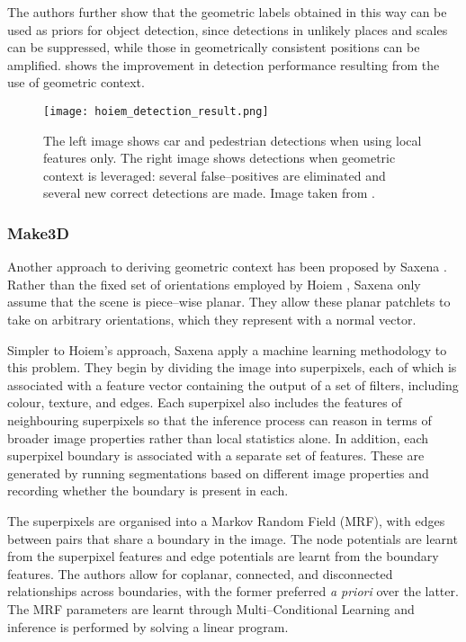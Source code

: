 The authors further show that the geometric labels obtained in this
way can be used as priors for object detection, since detections in
unlikely places and scales can be suppressed, while those in
geometrically consistent positions can be
amplified.  shows the improvement in detection
performance resulting from the use of geometric context.

\begin{figure}[htp]
\centering
\texttt{[image: hoiem\_detection\_result.png]}
\caption{The left image shows car and pedestrian detections when using
  local features only. The right image shows detections when geometric
  context is leveraged: several false--positives are eliminated and
  several new correct detections are made. Image taken from
  \cite{Hoiem06}.}
\label{fig:hoiem-result}
\end{figure}

\subsubsection{Make3D}

Another approach to deriving geometric context has been proposed by
Saxena \etal \cite{Saxena09}. Rather than the fixed set of
orientations employed by Hoiem \etal, Saxena \etal only assume that
the scene is piece--wise planar. They allow these planar patchlets to
take on arbitrary orientations, which they represent with a normal
vector.

Simpler to Hoiem's approach, Saxena \etal apply a machine learning
methodology to this problem. They begin by dividing the image into
superpixels, each of which is associated with a feature vector
containing the output of a set of filters, including colour, texture,
and edges. Each superpixel also includes the features of neighbouring
superpixels so that the inference process can reason in terms of
broader image properties rather than local statistics alone. In
addition, each superpixel boundary is associated with a separate set
of features. These are generated by running segmentations based on
different image properties and recording whether the boundary is
present in each.

The superpixels are organised into a Markov Random Field (MRF), with
edges between pairs that share a boundary in the image. The node
potentials are learnt from the superpixel features and edge
potentials are learnt from the boundary features. The authors allow
for coplanar, connected, and disconnected relationships across
boundaries, with the former preferred \textit{a priori} over the
latter. The MRF parameters are learnt through Multi--Conditional
Learning and inference is performed by solving a linear program.

